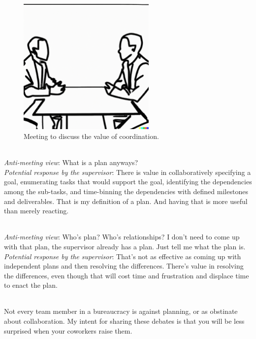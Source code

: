 \begin{figure}[H]
    \centering
\includegraphics[width=0.6\textwidth]{images/confrontational_meeting_of_two_people_in_a_conference_room_both_are_seated.pdf}
    \caption{Meeting to discuss the value of coordination.}
    \label{fig:meeting-to-discuss-coordination}
\end{figure}


\ \\
\textit{Anti-meeting view}: What is a plan anyways?\\
\textit{Potential response by the supervisor}: There is value in collaboratively specifying a goal, enumerating tasks that would support the goal, identifying the dependencies among the sub-tasks, and time-binning the dependencies with defined milestones and deliverables. That is my definition of a plan. And having that is more useful than merely reacting.

\ \\
\textit{Anti-meeting view}: Who's plan? Who's relationships? I don't need to come up with that plan, the supervisor already has a plan. Just tell me what the plan is.\\
\textit{Potential response by the supervisor}: That's not as effective as coming up with independent plans and then resolving the differences. There's value in resolving the differences, even though that will cost time and frustration and displace time to enact the plan.


\ \\

Not every team member in a bureaucracy is against planning, or as obstinate about collaboration. 
My intent for sharing these debates is that you will be less surprised when your coworkers raise them. 
